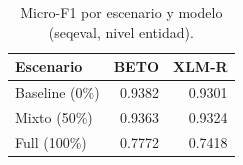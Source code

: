 \begin{table}
\caption{Micro-F1 por escenario y modelo (seqeval, nivel entidad).}
\label{tab:micro_f1}
\begin{tabular}{lrr}
\toprule
Escenario & BETO & XLM-R \\
\midrule
Baseline (0\%) & 0.9382 & 0.9301 \\
Mixto (50\%) & 0.9363 & 0.9324 \\
Full (100\%) & 0.7772 & 0.7418 \\
\bottomrule
\end{tabular}
\end{table}
